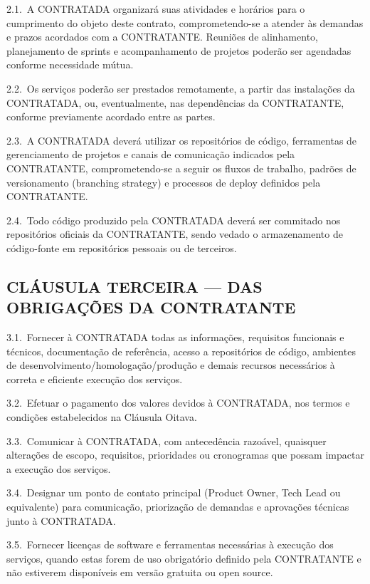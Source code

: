 \documentclass[11pt, a4paper]{article}
\begin{document}
2.1.\ A CONTRATADA organizará suas atividades e horários para o cumprimento do objeto deste contrato, comprometendo-se a atender às demandas e prazos acordados com a CONTRATANTE. Reuniões de alinhamento, planejamento de sprints e acompanhamento de projetos poderão ser agendadas conforme necessidade mútua.

2.2.\ Os serviços poderão ser prestados remotamente, a partir das instalações da CONTRATADA, ou, eventualmente, nas dependências da CONTRATANTE, conforme previamente acordado entre as partes.

2.3.\ A CONTRATADA deverá utilizar os repositórios de código, ferramentas de gerenciamento de projetos e canais de comunicação indicados pela CONTRATANTE, comprometendo-se a seguir os fluxos de trabalho, padrões de versionamento (branching strategy) e processos de deploy definidos pela CONTRATANTE.

2.4.\ Todo código produzido pela CONTRATADA deverá ser commitado nos repositórios oficiais da CONTRATANTE, sendo vedado o armazenamento de código-fonte em repositórios pessoais ou de terceiros.

\subsection{CLÁUSULA TERCEIRA — DAS OBRIGAÇÕES DA CONTRATANTE}

3.1.\ Fornecer à CONTRATADA todas as informações, requisitos funcionais e técnicos, documentação de referência, acesso a repositórios de código, ambientes de desenvolvimento/homologação/produção e demais recursos necessários à correta e eficiente execução dos serviços.

3.2.\ Efetuar o pagamento dos valores devidos à CONTRATADA, nos termos e condições estabelecidos na Cláusula Oitava.

3.3.\ Comunicar à CONTRATADA, com antecedência razoável, quaisquer alterações de escopo, requisitos, prioridades ou cronogramas que possam impactar a execução dos serviços.

3.4.\ Designar um ponto de contato principal (Product Owner, Tech Lead ou equivalente) para comunicação, priorização de demandas e aprovações técnicas junto à CONTRATADA.

3.5.\ Fornecer licenças de software e ferramentas necessárias à execução dos serviços, quando estas forem de uso obrigatório definido pela CONTRATANTE e não estiverem disponíveis em versão gratuita ou open source.

\end{document}
